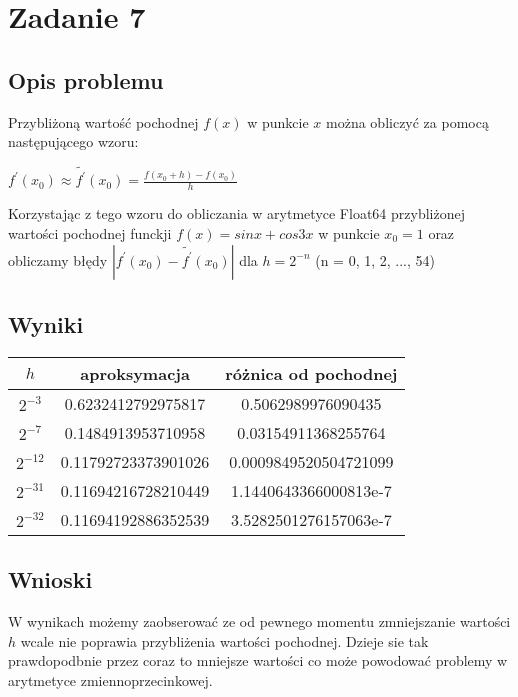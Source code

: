 \documentclass{article}
\begin{document}
\section{Zadanie 7}
\subsection{Opis problemu}
    Przybliżoną wartość pochodnej $f(x)$ w punkcie $x$ można obliczyć za pomocą następującego wzoru:\\
    \begin{center}
        $f^{'}(x_0)\approx\tilde{f^{'}}(x_0) = \frac{f(x_0+h) - f(x_0)}{h}$
    \end{center}
    Korzystając z tego wzoru do obliczania w arytmetyce Float64 przybliżonej wartości pochodnej funckji $f(x)=sinx+cos3x$ w punkcie $x_0 = 1$ oraz obliczamy błędy $|f^{'}(x_0) - \tilde{f^{'}}(x_0)|$ dla $h=2^{-n}$ (n = 0, 1, 2, ..., 54)
\subsection{Wyniki}
	\begin{center}
        \begin{tabular}{|c||c|c|}
        \hline
            $h$ & aproksymacja & różnica od pochodnej\\
            \hline\hline
            $2^{-3}$ & 0.6232412792975817 & 0.5062989976090435\\
            \hline
            $2^{-7}$ & 0.1484913953710958 & 0.03154911368255764\\
            \hline
            $2^{-12}$ & 0.11792723373901026 & 0.0009849520504721099\\
            \hline
            $2^{-31}$ & 0.11694216728210449 & 1.1440643366000813e-7\\
            \hline
            $2^{-32}$ & 0.11694192886352539 & 3.5282501276157063e-7\\
        \hline
        \end{tabular}
    \end{center}
\subsection{Wnioski}
    W wynikach możemy zaobserować ze od pewnego momentu zmniejszanie wartości $h$ wcale nie poprawia przybliżenia wartości pochodnej. Dzieje sie tak prawdopodbnie przez coraz to mniejsze wartości co może powodować problemy w arytmetyce zmiennoprzecinkowej.
\end{document}
